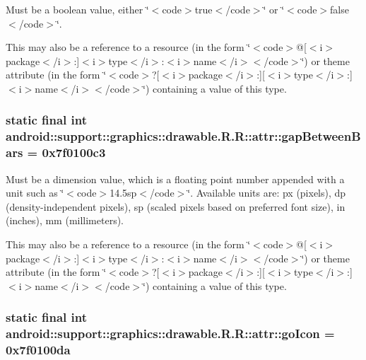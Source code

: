 Must be a boolean value, either \char`\"{}$<$code$>$true$<$/code$>$\char`\"{} or \char`\"{}$<$code$>$false$<$/code$>$\char`\"{}. 

This may also be a reference to a resource (in the form \char`\"{}$<$code$>$@\mbox{[}$<$i$>$package$<$/i$>$:\mbox{]}$<$i$>$type$<$/i$>$:$<$i$>$name$<$/i$>$$<$/code$>$\char`\"{}) or theme attribute (in the form \char`\"{}$<$code$>$?\mbox{[}$<$i$>$package$<$/i$>$:\mbox{]}\mbox{[}$<$i$>$type$<$/i$>$:\mbox{]}$<$i$>$name$<$/i$>$$<$/code$>$\char`\"{}) containing a value of this type. \hypertarget{classandroid_1_1support_1_1graphics_1_1drawable_1_1_r_1_1attr_8606654add7aaa51b6b773d653bb5267}{
\subsubsection[{gapBetweenBars}]{\setlength{\rightskip}{0pt plus 5cm}static final int android::support::graphics::drawable.R.R::attr::gapBetweenBars = 0x7f0100c3}}
\label{classandroid_1_1support_1_1graphics_1_1drawable_1_1_r_1_1attr_8606654add7aaa51b6b773d653bb5267}


Must be a dimension value, which is a floating point number appended with a unit such as \char`\"{}$<$code$>$14.5sp$<$/code$>$\char`\"{}. Available units are: px (pixels), dp (density-independent pixels), sp (scaled pixels based on preferred font size), in (inches), mm (millimeters). 

This may also be a reference to a resource (in the form \char`\"{}$<$code$>$@\mbox{[}$<$i$>$package$<$/i$>$:\mbox{]}$<$i$>$type$<$/i$>$:$<$i$>$name$<$/i$>$$<$/code$>$\char`\"{}) or theme attribute (in the form \char`\"{}$<$code$>$?\mbox{[}$<$i$>$package$<$/i$>$:\mbox{]}\mbox{[}$<$i$>$type$<$/i$>$:\mbox{]}$<$i$>$name$<$/i$>$$<$/code$>$\char`\"{}) containing a value of this type. \hypertarget{classandroid_1_1support_1_1graphics_1_1drawable_1_1_r_1_1attr_6b8bce65c848773ffceee7bdddbdab2b}{
\subsubsection[{goIcon}]{\setlength{\rightskip}{0pt plus 5cm}static final int android::support::graphics::drawable.R.R::attr::goIcon = 0x7f0100da}}
\label{classandroid_1_1support_1_1graphics_1_1drawable_1_1_r_1_1attr_6b8bce65c848773ffceee7bdddbdab2b}


